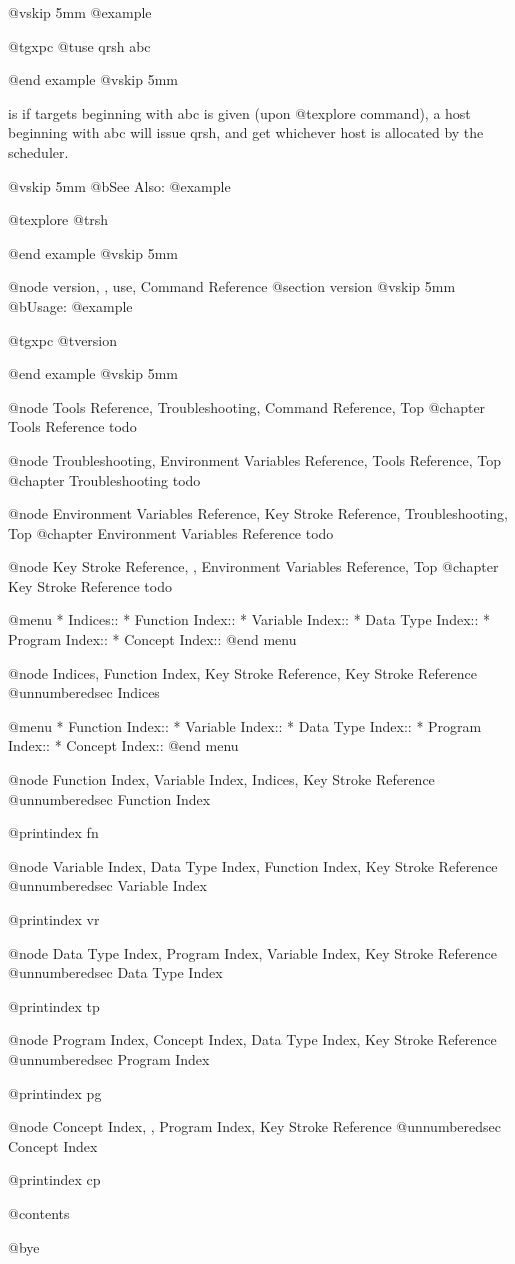 @vskip 5mm
@example

  @t{gxpc} @t{use} qrsh abc

@end example
@vskip 5mm

is if targets beginning with abc is given (upon @t{explore} command),
a host beginning with abc will issue qrsh, and get whichever host
is allocated by the scheduler.

@vskip 5mm
@b{See Also:}
@example

  @t{explore} @t{rsh}

@end example
@vskip 5mm

@node version,  , use, Command Reference
@section version
@vskip 5mm
@b{Usage:}
@example

  @t{gxpc} @t{version}

@end example
@vskip 5mm


@node Tools Reference, Troubleshooting, Command Reference, Top
@chapter Tools Reference
todo

@node Troubleshooting, Environment Variables Reference, Tools Reference, Top
@chapter Troubleshooting
todo

@node Environment Variables Reference, Key Stroke Reference, Troubleshooting, Top
@chapter Environment Variables Reference
todo

@node Key Stroke Reference,  , Environment Variables Reference, Top
@chapter Key Stroke Reference
todo

@menu
* Indices::                     
* Function Index::              
* Variable Index::              
* Data Type Index::             
* Program Index::               
* Concept Index::               
@end menu

@node Indices, Function Index, Key Stroke Reference, Key Stroke Reference
@unnumberedsec Indices

@menu
* Function Index::              
* Variable Index::              
* Data Type Index::             
* Program Index::               
* Concept Index::               
@end menu

@node Function Index, Variable Index, Indices, Key Stroke Reference
@unnumberedsec Function Index

@printindex fn

@node Variable Index, Data Type Index, Function Index, Key Stroke Reference
@unnumberedsec Variable Index

@printindex vr

@node Data Type Index, Program Index, Variable Index, Key Stroke Reference
@unnumberedsec Data Type Index

@printindex tp

@node Program Index, Concept Index, Data Type Index, Key Stroke Reference
@unnumberedsec Program Index

@printindex pg

@node Concept Index,  , Program Index, Key Stroke Reference
@unnumberedsec Concept Index

@printindex cp


@contents

@bye
                                   

